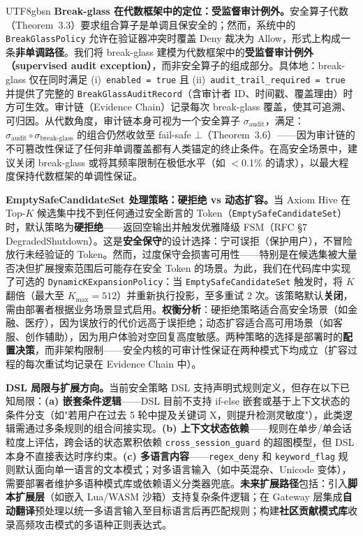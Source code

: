 \documentclass[letterpaper,twocolumn,10pt]{article}
\begin{document}
\begin{CJK}{UTF8}{gbsn}
\textbf{Break-glass 在代数框架中的定位：受监督审计例外。}安全算子代数（Theorem~3.3）要求组合算子是单调且保安全的；然而，系统中的 \texttt{BreakGlassPolicy} 允许在验证器冲突时覆盖 Deny 裁决为 Allow，形式上构成一条\textbf{非单调路径}。我们将 break-glass 建模为代数框架中的\textbf{受监督审计例外（supervised audit exception）}，而非安全算子的组成部分。具体地：break-glass 仅在同时满足 (i)~\texttt{enabled = true} 且 (ii)~\texttt{audit\_trail\_required = true} 并提供了完整的 \texttt{BreakGlassAuditRecord}（含审计者 ID、时间戳、覆盖理由）时方可生效。审计链（Evidence Chain）记录每次 break-glass 覆盖，使其可追溯、可归因。从代数角度，审计链本身可视为一个安全算子 $\sigma_{\mathrm{audit}}$，满足：$\sigma_{\mathrm{audit}} \circ \sigma_{\mathrm{break\text{-}glass}}$ 的组合仍然收敛至 fail-safe $\bot$（Theorem~3.6）——因为审计链的不可篡改性保证了任何非单调覆盖都有人类锚定的终止条件。在高安全场景中，建议关闭 break-glass 或将其频率限制在极低水平（如 $<$0.1\% 的请求），以最大程度保持代数框架的单调性保证。

\textbf{EmptySafeCandidateSet 处理策略：硬拒绝 vs 动态扩容。}当 Axiom Hive 在 Top-$K$ 候选集中找不到任何通过安全断言的 Token（\texttt{EmptySafeCandidateSet}）时，默认策略为\textbf{硬拒绝}——返回空输出并触发优雅降级 FSM（RFC \S 7 DegradedShutdown）。这是\textbf{安全保守}的设计选择：宁可误拒（保护用户），不冒险放行未经验证的 Token。然而，过度保守会损害可用性——特别是在候选集被大量否决但扩展搜索范围后可能存在安全 Token 的场景。为此，我们在代码库中实现了可选的 \texttt{DynamicKExpansionPolicy}：当 \texttt{EmptySafeCandidateSet} 触发时，将 $K$ 翻倍（最大至 $K_{\max}=512$）并重新执行投影，至多重试 2 次。该策略默认\textbf{关闭}，需由部署者根据业务场景显式启用。\textbf{权衡分析}：硬拒绝策略适合高安全场景（如金融、医疗），因为误放行的代价远高于误拒绝；动态扩容适合高可用场景（如客服、创作辅助），因为用户体验对空回复高度敏感。两种策略的选择是部署时的\textbf{配置决策}，而非架构限制——安全内核的可审计性保证在两种模式下均成立（扩容过程的每次重试均记录在 Evidence Chain 中）。

\textbf{DSL 局限与扩展方向。}当前安全策略 DSL 支持声明式规则定义，但存在以下已知局限：\textbf{(a) 嵌套条件逻辑}——DSL 目前不支持 if-else 嵌套或基于上下文状态的条件分支（如"若用户在过去 5 轮中提及关键词 X，则提升检测灵敏度"），此类逻辑需通过多条规则的组合间接实现。\textbf{(b) 上下文状态依赖}——规则在单步/单会话粒度上评估，跨会话的状态累积依赖 \texttt{cross\_session\_guard} 的超图模型，但 DSL 本身不直接表达时序约束。\textbf{(c) 多语言内容}——\texttt{regex\_deny} 和 \texttt{keyword\_flag} 规则默认面向单一语言的文本模式；对多语言输入（如中英混杂、Unicode 变体），需要部署者维护多语种模式库或依赖语义分类器兜底。\textbf{未来扩展路径}包括：引入\textbf{脚本扩展层}（如嵌入 Lua/WASM 沙箱）支持复杂条件逻辑；在 Gateway 层集成\textbf{自动翻译}预处理以统一多语言输入至目标语言后再匹配规则；构建\textbf{社区贡献模式库}收录高频攻击模式的多语种正则表达式。


\end{CJK}
\end{document}
